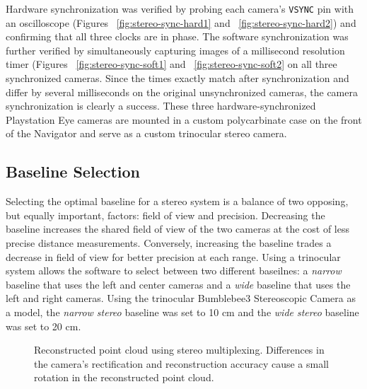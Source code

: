 \documentclass[twocolumn,11pt]{article}
\begin{document}
Hardware synchronization was verified by probing each camera's \texttt{VSYNC}
pin with an oscilloscope (Figures ~\ref{fig:stereo-sync-hard1} and
~\ref{fig:stereo-sync-hard2}) and confirming that all three clocks are in
phase. The software synchronization was further verified by simultaneously
capturing images of a millisecond resolution timer (Figures
~\ref{fig:stereo-sync-soft1} and ~\ref{fig:stereo-sync-soft2} on all three
synchronized cameras. Since the times exactly match after synchronization and
differ by several milliseconds on the original unsynchronized cameras, the
camera synchronization is clearly a success. These three hardware-synchronized
Playstation Eye cameras are mounted in a custom polycarbinate case on the front
of the Navigator and serve as a custom trinocular stereo camera.

\subsection{Baseline Selection}
\label{sec:stereo-mux}
Selecting the optimal baseline for a stereo system is a balance of two
opposing, but equally important, factors: field of view and precision.
Decreasing the baseline increases the shared field of view of the two cameras
at the cost of less precise distance measurements. Conversely, increasing the
baseline trades a decrease in field of view for better precision at each
range. Using a trinocular system allows the software to select between
two different baseilnes: a \textit{narrow} baseline that uses the left and
center cameras and a \textit{wide} baseline that uses the left and right
cameras. Using the trinocular Bumblebee3 Stereoscopic Camera as a model, the
\textit{narrow stereo} baseline was set to 10 cm and the \textit{wide stereo}
baseline was set to 20 cm.

\begin{figure*}
	\centering
	\caption{
		Reconstructed point cloud using stereo multiplexing. Differences in the
		camera's rectification and reconstruction accuracy cause a small
		rotation in the reconstructed point cloud.
	}
	\label{fig:stereo-dist}
\end{figure*}
\end{document}
